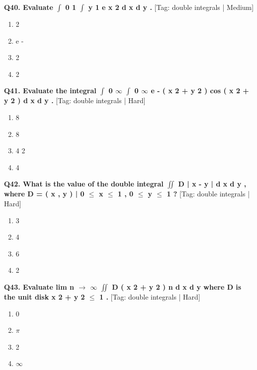 \noindent\textbf{Q40. Evaluate $\int$ 0 1 $\int$ y 1 e x 2 d x d y .} \hfill [Tag: double integrals | Medium]
\begin{enumerate}[label=(\alph*),topsep=2pt,itemsep=1pt,partopsep=0pt,parsep=0pt]
    \item {{2}}
    \item {{e -}}
    \item {{2}}
    \item {{2}}
\end{enumerate}
\vspace{2mm}

\noindent\textbf{Q41. Evaluate the integral $\int$ 0 $\infty$ $\int$ 0 $\infty$ e - ( x 2 + y 2 ) cos ( x 2 + y 2 ) d x d y .} \hfill [Tag: double integrals | Hard]
\begin{enumerate}[label=(\alph*),topsep=2pt,itemsep=1pt,partopsep=0pt,parsep=0pt]
    \item {{8}}
    \item {{8}}
    \item {{4 2}}
    \item {{4}}
\end{enumerate}
\vspace{2mm}

\noindent\textbf{Q42. What is the value of the double integral $\iint$ D | x - y | d x d y , where D = {( x , y ) | 0 $\le$ x $\le$ 1 , 0 $\le$ y $\le$ 1 } ?} \hfill [Tag: double integrals | Hard]
\begin{enumerate}[label=(\alph*),topsep=2pt,itemsep=1pt,partopsep=0pt,parsep=0pt]
    \item {{3}}
    \item {{4}}
    \item {{6}}
    \item {{2}}
\end{enumerate}
\vspace{2mm}

\noindent\textbf{Q43. Evaluate lim n $\to$ $\infty$ $\iint$ D ( x 2 + y 2 ) n d x d y where D is the unit disk x 2 + y 2 $\le$ 1 .} \hfill [Tag: double integrals | Hard]
\begin{enumerate}[label=(\alph*),topsep=2pt,itemsep=1pt,partopsep=0pt,parsep=0pt]
    \item {{0}}
    \item {{$\pi$}}
    \item {{2}}
    \item {{$\infty$}}
\end{enumerate}
\vspace{2mm}

